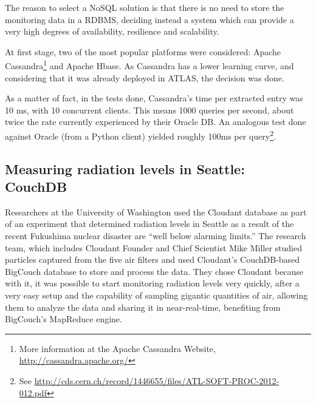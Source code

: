 
The reason to select a NoSQL solution is
that
there is no need to store the monitoring data in a RDBMS, deciding instead a system which can provide a very high degrees of availability, resilience and scalability.

At first stage, two of the most popular platforms were considered: Apache
Cassandra\footnote{More information at the Apache Cassandra Website, \url{http://cassandra.apache.org/}}
and Apache Hbase. As Cassandra has a lower learning curve, and considering that it was already deployed in ATLAS, the decision was done. %

As a matter of fact, in the tests done, Cassandra's time per extracted entry was 10 ms, with 10 concurrent clients. This means 1000 queries per second, about twice the rate currently experienced by their Oracle DB. An analogous test done against Oracle (from a Python client) yielded roughly 100ms per
query\footnote{See \url{http://cds.cern.ch/record/1446655/files/ATL-SOFT-PROC-2012-012.pdf}}.


\subsection{Measuring radiation levels in Seattle: CouchDB} %
\label{sec:measuring_radiation_levels_in_seattle_couchdb}

Researchers at the University of Washington used the Cloudant  database as part of an experiment that determined radiation levels in Seattle as a result of the recent Fukushima nuclear disaster are ``well below alarming limits.'' The research team, which includes Cloudant Founder and Chief Scientist Mike Miller studied particles captured from the five air filters and used Cloudant’s CouchDB-based BigCouch database to store and process the data. They chose Cloudant because with it, it was possible to start monitoring radiation levels very quickly, after a very easy setup and the capability of sampling gigantic quantities of air, allowing them to analyze the data and sharing it in near-real-time,
benefiting from BigCouch's MapReduce engine.

